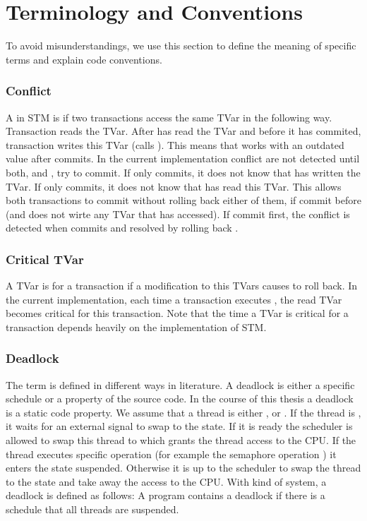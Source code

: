 \section{Terminology and Conventions}
\label{definitions}
To avoid misunderstandings, we use this section to define the meaning of specific terms and explain code conventions.

\subsubsection{Conflict}
A  in STM is if two transactions access the same TVar in the following way. Transaction  reads 
the TVar. After  has read the TVar and before it has commited, transaction  writes this TVar (calls ). 
This means that  works with an outdated value after  commits. In the current implementation
conflict are not detected until both,  and , try to commit. If only  commits, it does not 
know that  has written the TVar. If only  commits, it does not know that  has read this TVar.
This allows both transactions to commit without rolling back either of them, if  commit before  (and 
does not wirte any TVar that  has accessed). If  commit first, the conflict is detected when  commits
and resolved by rolling back .

\subsubsection{Critical TVar}
A TVar is  for a transaction  if a modification to this TVars causes  to roll back. In the current
implementation, each time a transaction executes , the read TVar becomes critical for this transaction. Note that the
time a TVar is critical for a transaction depends heavily on the implementation of STM. 

\subsubsection{Deadlock}
The term  is defined in different ways in literature. A deadlock is either a specific
schedule or a property of the source code. In the course of this thesis a deadlock
is a static code property. We assume that a thread is either ,  or .
If the thread is , it waits for an external signal to swap to the  state. If it
is ready the scheduler is allowed to swap this thread to  which grants the thread access to
the CPU. If the thread executes specific operation (for example the semaphore operation ) it enters 
the state suspended. Otherwise it is up to the scheduler to swap the thread to the  state and
take away the access to the CPU. With kind of system, a deadlock is defined as follows:
A program contains a deadlock if there is a schedule that all threads are suspended.

